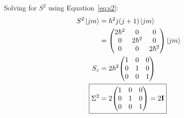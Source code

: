 \documentclass{jhwhw}
\begin{document}
Solving for $S^2$ using Equation~\eqref{eq:s2}:
\begin{align}
    S^{2}\ket{j m}
    &=
    \hbar^2 j(j+1)\ket{j m}
    \\
    &=
    \begin{pmatrix}
        2\hbar^2   &   0   &   0   \\
        0   &   2\hbar^2   &   0   \\
        0   &   0   &   2\hbar^2
    \end{pmatrix}
    \ket{j m}
    \\
     S_{z}
     &=
     2\hbar^2 
     {\begin{pmatrix}
         1   &   0   &   0   \\
         0   &   1   &   0   \\
         0   &   0   &   1
     \end{pmatrix}}
     \\
     \Aboxed{
     \Sigma^{2}
     &=
     2
     {\begin{pmatrix}
          1   &   0   &   0   \\
          0   &   1   &   0   \\
          0   &   0   &   1
      \end{pmatrix}} = 2 \mathbf{I}}
\end{align}




 
 \nocite{*}
\end{document}
